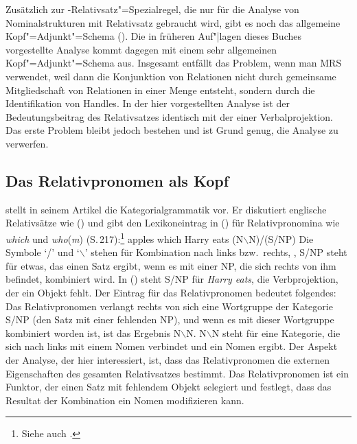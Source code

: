 Zusätzlich zur \nbar\hyp Relativsatz"=Spezialregel, die nur für die Analyse von
Nominalstrukturen mit Relativsatz gebraucht wird, gibt es noch das allgemeine
Kopf"=Adjunkt"=Schema (). Die in früheren Auf"|lagen dieses Buches vorgestellte
Analyse kommt dagegen mit einem sehr allgemeinen Kopf"=Adjunkt"=Schema aus. Insgesamt entfällt das
Problem, wenn man MRS verwendet, weil dann die Konjunktion von Relationen nicht durch gemeinsame
Mitgliedschaft von Relationen in einer Menge entsteht, sondern durch die Identifikation von
Handles. In der hier vorgestellten Analyse ist der Bedeutungsbeitrag des Relativsatzes identisch mit
der einer Verbalprojektion. Das erste Problem bleibt jedoch bestehen und ist Grund genug, die Analyse zu verwerfen.


\subsection{Das Relativpronomen als Kopf}


\citet{Steedman89a} stellt in seinem Artikel die Kategorialgrammatik vor.
Er diskutiert englische Relativsätze wie () und gibt den
Lexikoneintrag in () für Relativpronomina wie \emph{which} und \emph{who}(\emph{m})
(S.\,217):\footnote{
  Siehe auch .
}
\ea
apples which Harry eats
\z
\ea
(N$\backslash$N)/(S/NP)
\z
\largerpage
Die Symbole `/' und `$\backslash$' stehen für Kombination nach links bzw.\
rechts, \dash, S/NP steht für etwas, das einen Satz ergibt, wenn es mit einer NP,
die sich rechts von ihm befindet, kombiniert wird. In (\mex{0}) steht
S/NP für \emph{Harry eats}, \dash die Verbprojektion, der ein Objekt fehlt.
Der Eintrag für das Relativpronomen bedeutet folgendes: Das Relativpronomen
verlangt rechts von sich eine Wortgruppe der Kategorie S/NP (den Satz mit einer
fehlenden NP), und wenn es mit dieser Wortgruppe kombiniert worden ist, ist das
Ergebnis N$\backslash$N. N$\backslash$N steht für eine Kategorie, die sich
nach links mit einem Nomen verbindet und ein Nomen ergibt. 
Der Aspekt der Analyse, der hier interessiert, ist, dass das Relativpronomen
die externen Eigenschaften des gesamten Relativsatzes bestimmt. Das Relativpronomen
ist ein Funktor, der einen Satz mit fehlendem Objekt selegiert und festlegt,
dass das Resultat der Kombination ein Nomen modifizieren kann.

